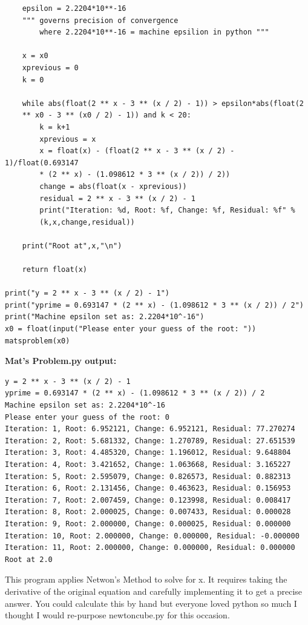\documentclass[12pt]{article}
\begin{document}
\begin{enumerate}[label=\textbf{\arabic*}.]
\begin{verbatim}
    epsilon = 2.2204*10**-16
    """ governs precision of convergence
        where 2.2204*10**-16 = machine epsilion in python """
    
    x = x0
    xprevious = 0
    k = 0

    while abs(float(2 ** x - 3 ** (x / 2) - 1)) > epsilon*abs(float(2 
    ** x0 - 3 ** (x0 / 2) - 1)) and k < 20:
        k = k+1
        xprevious = x
        x = float(x) - (float(2 ** x - 3 ** (x / 2) - 1)/float(0.693147 
        * (2 ** x) - (1.098612 * 3 ** (x / 2)) / 2))
        change = abs(float(x - xprevious))
        residual = 2 ** x - 3 ** (x / 2) - 1
        print("Iteration: %d, Root: %f, Change: %f, Residual: %f" % 
        (k,x,change,residual))
    
    print("Root at",x,"\n")

    return float(x)

print("y = 2 ** x - 3 ** (x / 2) - 1")
print("yprime = 0.693147 * (2 ** x) - (1.098612 * 3 ** (x / 2)) / 2")
print("Machine epsilon set as: 2.2204*10^-16")
x0 = float(input("Please enter your guess of the root: "))
matsproblem(x0)
\end{verbatim}

\newpage

\textbf{Mat's Problem.py output:}
\begin{verbatim}
y = 2 ** x - 3 ** (x / 2) - 1
yprime = 0.693147 * (2 ** x) - (1.098612 * 3 ** (x / 2)) / 2
Machine epsilon set as: 2.2204*10^-16
Please enter your guess of the root: 0
Iteration: 1, Root: 6.952121, Change: 6.952121, Residual: 77.270274
Iteration: 2, Root: 5.681332, Change: 1.270789, Residual: 27.651539
Iteration: 3, Root: 4.485320, Change: 1.196012, Residual: 9.648804
Iteration: 4, Root: 3.421652, Change: 1.063668, Residual: 3.165227
Iteration: 5, Root: 2.595079, Change: 0.826573, Residual: 0.882313
Iteration: 6, Root: 2.131456, Change: 0.463623, Residual: 0.156953
Iteration: 7, Root: 2.007459, Change: 0.123998, Residual: 0.008417
Iteration: 8, Root: 2.000025, Change: 0.007433, Residual: 0.000028
Iteration: 9, Root: 2.000000, Change: 0.000025, Residual: 0.000000
Iteration: 10, Root: 2.000000, Change: 0.000000, Residual: -0.000000
Iteration: 11, Root: 2.000000, Change: 0.000000, Residual: 0.000000
Root at 2.0
\end{verbatim}

This program applies Netwon's Method to solve for x. It requires taking the derivative of the original equation and carefully implementing it to get a precise answer. You could calculate this by hand but everyone loved python so much I thought I would re-purpose newtoncube.py for this occasion.


\end{enumerate}
\end{document}
